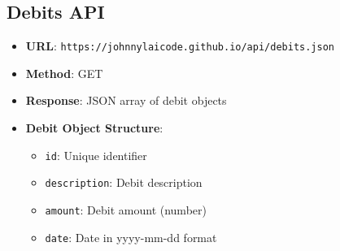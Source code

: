 \documentclass[11pt,a4paper]{article}
\begin{document}
\subsection{Debits API}
\begin{itemize}[leftmargin=*]
    \item \textbf{URL}: \texttt{https://johnnylaicode.github.io/api/debits.json}
    \item \textbf{Method}: GET
    \item \textbf{Response}: JSON array of debit objects
    \item \textbf{Debit Object Structure}:
        \begin{itemize}
            \item \texttt{id}: Unique identifier
            \item \texttt{description}: Debit description
            \item \texttt{amount}: Debit amount (number)
            \item \texttt{date}: Date in yyyy-mm-dd format
        \end{itemize}
\end{itemize}
\end{document}
